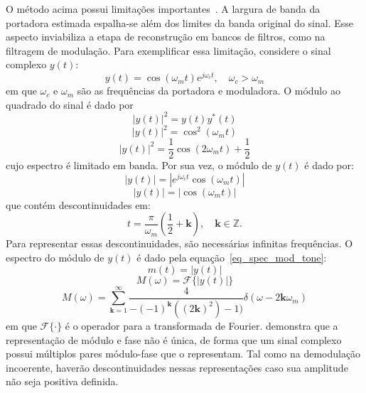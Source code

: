 O método acima possui limitações importantes~\cite{schimmel2007}. A largura de
banda da portadora estimada espalha-se além dos limites da banda original do
sinal. Esse aspecto inviabiliza a etapa de reconstrução em bancos de filtros,
como na filtragem de modulação. Para exemplificar essa limitação, considere o
sinal complexo $y(t)$:
\begin{equation}
    y(t) = \cos(\omega_m t) e^{j\omega_c t}, \quad \omega_c > \omega_m 
\end{equation}
em que $\omega_c$ e $\omega_m$ são as frequências da portadora e moduladora. O
módulo ao quadrado do sinal é dado por
\begin{equation}
    |y(t)|^2  = y(t)y^*(t)
\end{equation}
\begin{equation}
    |y(t)|^2 = \cos^2(\omega_m t)
\end{equation}
\begin{equation}
    |y(t)|^2 = \frac{1}{2}\cos(2 \omega_m t) + \frac{1}{2}
\end{equation}
cujo espectro é limitado em banda. Por sua vez, o módulo de $y(t)$ é dado
por:
\begin{equation}
   |y(t)| = |e^{j\omega_c t}\cos(\omega_m t)|
\end{equation}
\begin{equation}
    |y(t)| = |\cos(\omega_m t)|
\end{equation}
que contém descontinuidades em:
\begin{equation}
t = \frac{\pi}{\omega_m} (\frac{1}{2}+ \mathbf{k}), \quad \mathbf{k} \in \mathbb{Z} .
\end{equation}
Para representar essas descontinuidades, são necessárias infinitas frequências.
O espectro do módulo de $y(t)$ é dado pela equação~\ref{eq_spec_mod_tone}:
\begin{equation}
     m(t) = |y(t)|
\end{equation}
\begin{equation}
    M(\omega) = \mathcal{F}\{|y(t)|\}
\end{equation}
\begin{equation} \label{eq_spec_mod_tone}
    M(\omega) = \sum_{\mathbf{k} = 1}^{\infty}\frac{4}{-(-1)^\mathbf{k} ((2\mathbf{k})^2) - 1)} \delta(\omega - 2 \mathbf{k} \omega_m)   
\end{equation}
em que $\mathcal{F\{\cdot\}}$ é o operador para a transformada de Fourier.
\citet{cohen1999ambiguity} demonstra que a representação de módulo e fase não é
única, de forma que um sinal complexo possui múltiplos pares módulo-fase que o
representam. Tal como na demodulação incoerente, haverão descontinuidades nessas
representações caso sua amplitude não seja positiva definida.

